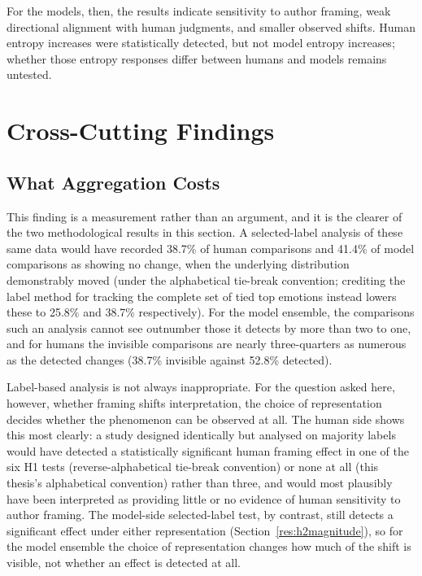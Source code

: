 For the models, then, the results indicate sensitivity to author framing, weak directional
alignment with human judgments, and smaller observed shifts. Human entropy increases were
statistically detected, but not model entropy increases; whether those entropy responses differ
between humans and models remains untested.

\section{Cross-Cutting Findings}
\label{disc:crosscutting}

\subsection{What Aggregation Costs}
\label{disc:aggregation}

\noindent
This finding is a measurement rather than an argument, and it is the clearer of the two
methodological results in this section. A selected-label analysis of these same data would have
recorded 38.7\% of human comparisons and 41.4\% of model comparisons as showing no change, when
the underlying distribution demonstrably moved (under the alphabetical tie-break convention;
crediting the label method for tracking the complete set of tied top emotions instead lowers these
to 25.8\% and 38.7\% respectively). For the model ensemble, the comparisons such an analysis
cannot see outnumber those it detects by more than two to one, and for humans the invisible
comparisons are nearly three-quarters as numerous as the detected changes (38.7\% invisible
against 52.8\% detected).

Label-based analysis is not always inappropriate. For the question asked here, however, whether
framing shifts interpretation, the choice of representation decides whether the phenomenon can be observed at
all. The human side shows this most clearly: a study designed identically but analysed on
majority labels would have detected a statistically significant human framing effect in one of
the six H1 tests (reverse-alphabetical tie-break convention) or none at all (this thesis's
alphabetical convention) rather than three, and would most plausibly have been interpreted as
providing little or no evidence of human sensitivity to author framing. The model-side
selected-label test, by contrast, still detects a significant effect under either representation
(Section~\ref{res:h2magnitude}), so for the model ensemble the choice of representation
changes how much of the shift is visible, not whether an effect is detected at all.

